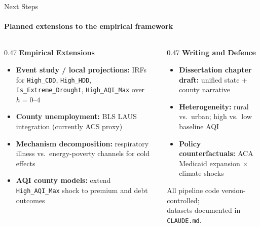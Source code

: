 \documentclass[aspectratio=169,11pt]{beamer}
\newcommand{\emphcolor}[1]{{\color{WarmOrange}\textbf{#1}}}
\newcommand{\tealtext}[1]{{\color{Teal}#1}}
\begin{document}
\begin{frame}{Next Steps}
  \framesubtitle{Planned extensions to the empirical framework}
  \begin{columns}[T]
    \begin{column}{0.47\textwidth}
      \textbf{\tealtext{Empirical Extensions}}
      \begin{itemize}\itemsep0.32em
        \item \emphcolor{Event study / local projections:} IRFs for \texttt{High\_CDD}, \texttt{High\_HDD}, \texttt{Is\_Extreme\_Drought}, \texttt{High\_AQI\_Max} over $h = 0$--$4$
        \item \emphcolor{County unemployment:} BLS LAUS integration (currently ACS proxy)
        \item \emphcolor{Mechanism decomposition:} respiratory illness vs.\ energy-poverty channels for cold effects
        \item \emphcolor{AQI county models:} extend \texttt{High\_AQI\_Max} shock to premium and debt outcomes
      \end{itemize}
    \end{column}
    \begin{column}{0.47\textwidth}
      \textbf{\tealtext{Writing and Defence}}
      \begin{itemize}\itemsep0.32em
        \item \emphcolor{Dissertation chapter draft:} unified state + county narrative
        \item \emphcolor{Heterogeneity:} rural vs.\ urban; high vs.\ low baseline AQI
        \item \emphcolor{Policy counterfactuals:} ACA Medicaid expansion $\times$ climate shocks
      \end{itemize}
      \vspace{0.5em}
      \tealtext{\small All pipeline code version-controlled;\\ datasets documented in \texttt{CLAUDE.md}.}
    \end{column}
  \end{columns}
\end{frame}
\end{document}
